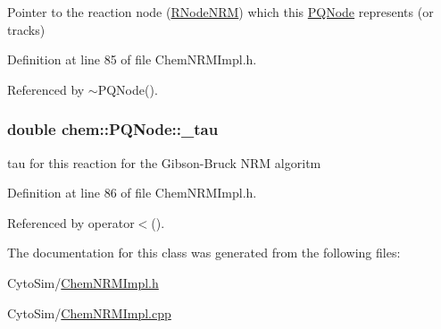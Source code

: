 Pointer to the reaction node (\hyperlink{classchem_1_1RNodeNRM}{R\-Node\-N\-R\-M}) which this \hyperlink{classchem_1_1PQNode}{P\-Q\-Node} represents (or tracks) 



Definition at line 85 of file Chem\-N\-R\-M\-Impl.\-h.



Referenced by $\sim$\-P\-Q\-Node().

\hypertarget{classchem_1_1PQNode_a77a83fe486c496c3e4bd4ffa72d8fb57}{
\subsubsection[{\-\_\-tau}]{\setlength{\rightskip}{0pt plus 5cm}double {\bf chem\-::\-P\-Q\-Node\-::\-\_\-tau}}}\label{classchem_1_1PQNode_a77a83fe486c496c3e4bd4ffa72d8fb57}


tau for this reaction for the Gibson-\/\-Bruck N\-R\-M algoritm 



Definition at line 86 of file Chem\-N\-R\-M\-Impl.\-h.



Referenced by operator$<$().



The documentation for this class was generated from the following files\-:\begin{DoxyCompactItemize}
\item 
Cyto\-Sim/\hyperlink{ChemNRMImpl_8h}{Chem\-N\-R\-M\-Impl.\-h}\item 
Cyto\-Sim/\hyperlink{ChemNRMImpl_8cpp}{Chem\-N\-R\-M\-Impl.\-cpp}\end{DoxyCompactItemize}

